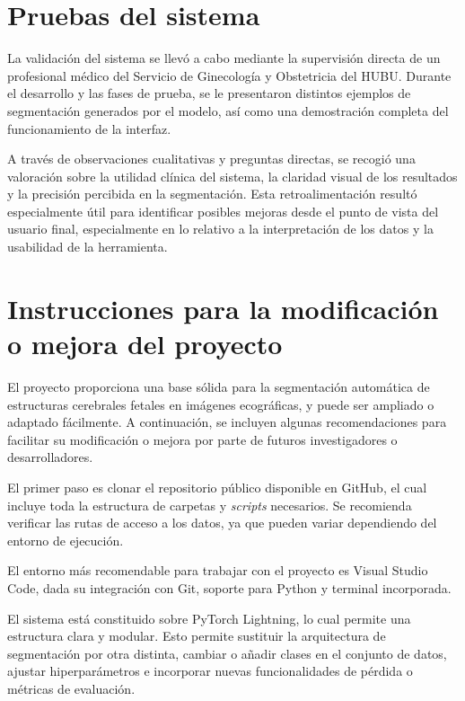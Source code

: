\section{Pruebas del sistema}

La validación del sistema se llevó a cabo mediante la supervisión directa de un profesional médico del Servicio de Ginecología y Obstetricia del HUBU. Durante el desarrollo y las fases de prueba, se le presentaron distintos ejemplos de segmentación generados por el modelo, así como una demostración completa del funcionamiento de la interfaz.

A través de observaciones cualitativas y preguntas directas, se recogió una valoración sobre la utilidad clínica del sistema, la claridad visual de los resultados y la precisión percibida en la segmentación. Esta retroalimentación resultó especialmente útil para identificar posibles mejoras desde el punto de vista del usuario final, especialmente en lo relativo a la interpretación de los datos y la usabilidad de la herramienta.



\section{Instrucciones para la modificación o mejora del proyecto}

El proyecto proporciona una base sólida para la segmentación automática de estructuras cerebrales fetales en imágenes ecográficas, y puede ser ampliado o adaptado fácilmente. A continuación, se incluyen algunas recomendaciones para facilitar su modificación o mejora por parte de futuros investigadores o desarrolladores.

El primer paso es clonar el repositorio público disponible en GitHub, el cual incluye toda la estructura de carpetas y \textit{scripts} necesarios. Se recomienda verificar las rutas de acceso a los datos, ya que pueden variar dependiendo del entorno de ejecución.

El entorno más recomendable para trabajar con el proyecto es Visual Studio Code, dada su integración con Git, soporte para Python y terminal incorporada. 

El sistema está constituido sobre PyTorch Lightning, lo cual permite una estructura clara y modular. Esto permite sustituir la arquitectura de segmentación por otra distinta, cambiar o añadir clases en el conjunto de datos, ajustar hiperparámetros e incorporar nuevas funcionalidades de pérdida o métricas de evaluación.

